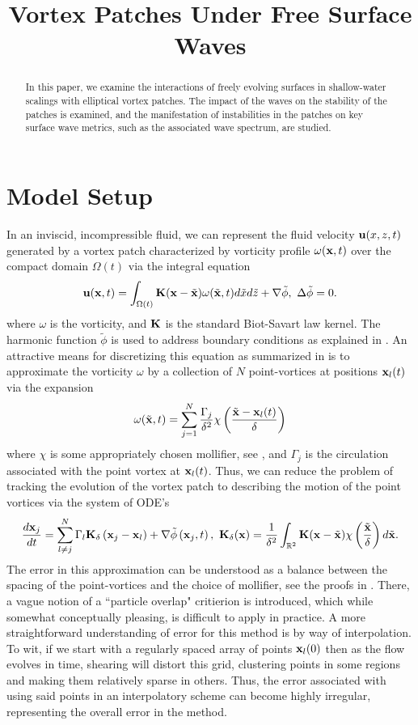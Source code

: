 \documentclass[a4paper,11pt]{article}
\title{Vortex Patches Under Free Surface Waves}
\date{}
\begin{document}
\maketitle
\begin{abstract}
In this paper, we examine the interactions of freely evolving surfaces in shallow-water scalings with elliptical vortex patches.   The impact of the waves on the stability of the patches is examined, and the manifestation of instabilities in the patches on key surface wave metrics, such as the associated wave spectrum, are studied. 
\end{abstract}
\section*{Model Setup}
In an inviscid, incompressible fluid, we can represent the fluid velocity ${\bf u}(x,z,t)$ generated by a vortex patch characterized by vorticity profile $\omega({\bf x},t)$ over the compact domain $\Omega(t)$ via the integral equation
\[
{\bf u}({\bf x},t) = \int_{\Omega(t)} {\bf K}({\bf x}-\tilde{{\bf x}})\omega(\tilde{{\bf x}},t)d\tilde{x}d\tilde{z} + \nabla \tilde{\phi}, ~ \Delta \tilde{\phi} = 0.
\]
where $\omega$ is the vorticity, and ${\bf K}$ is the standard Biot-Savart law kernel.  The harmonic function $\tilde{\phi}$ is used to address boundary conditions as explained in \cite{saffman}.  An attractive means for discretizing this equation as summarized in \cite{cottet} is to approximate the vorticity $\omega$ by a collection of $N$ point-vortices at positions ${\bf x}_{l}(t)$ via the expansion
\[
\omega(\tilde{{\bf x}},t) = \sum_{j=1}^{N} \frac{\Gamma_{j}}{\delta^{2}}\chi\left(\frac{\tilde{{\bf x}}-{\bf x}_{l}(t)}{\delta}\right) 
\]
where $\chi$ is some appropriately chosen mollifier, see \cite{beale}, and $\Gamma_{j}$ is the circulation associated with the point vortex at ${\bf x}_{l}(t)$.  Thus, we can reduce the problem of tracking the evolution of the vortex patch to describing the motion of the point vortices via the system of ODE's
\[
\frac{d{\bf x}_{j}}{dt}  =  \sum_{l\neq j}^{N} \Gamma_{l} {\bf K}_{\delta}\left({\bf x}_{j}-{\bf x}_{l}\right) + \nabla \tilde{\phi}\left({\bf x}_{j},t\right), ~ {\bf K}_{\delta}({\bf x}) = \frac{1}{\delta^{2}}\int_{\mathbb{R}^{2}}{\bf K}({\bf x} - \tilde{\bf x})\chi \left(\frac{\tilde{{\bf x}}}{\delta} \right) d \tilde{{\bf x}}.
\]
The error in this approximation can be understood as a balance between the spacing of the point-vortices and the choice of mollifier, see the proofs in \cite{cottet}.  There, a vague notion of a ``particle overlap" critierion is introduced, which while somewhat conceptually pleasing, is difficult to apply in practice.  A more straightforward understanding of error for this method is by way of interpolation.  To wit, if we start with a regularly spaced array of points ${\bf x}_{l}(0)$ then as the flow evolves in time, shearing will distort this grid, clustering points in some regions and making them relatively sparse in others.  Thus, the error associated with using said points in an interpolatory scheme can become highly irregular, representing the overall error in the method.  
\end{document}
